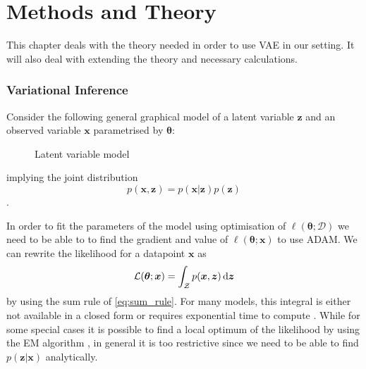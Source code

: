 \chapter{Methods and Theory}
\label{MethodsCh}

This chapter deals with the theory needed in order to use VAE in our setting. It
will also deal with extending the theory and necessary calculations.

\subsection{Variational Inference}
Consider the following general graphical model of a latent variable $\bm{z}$ and
an observed variable $\bm{x}$ parametrised by $\bm{\theta}$:
\begin{figure}[H]
  \label{tikz:latent_variable_model}
  \centering
  \caption{Latent variable model}
\end{figure}
implying the joint distribution
\begin{equation}
  \label{eq:latent_variable_model}
  p(\bm{x}, \bm{z}) = p(\bm{x} | \bm{z}) p(\bm{z})
\end{equation}.

In order to fit the parameters of the model using optimisation of
$\ell(\bm{\theta} ; \mathcal{D})$ we need to be able to to find the gradient and
value of $\ell(\bm{\theta} ; \bm{x})$ to use ADAM. We can rewrite
the likelihood for a datapoint $\bm{x}$ as
\begin{equation}
  \label{eq:likelihood_integrate_out_latent}
  \mathcal{L}(\bm{\theta} ; \bm{x}) = \int_{\mathcal{Z}} p(\bm{x}, \bm{z}) \dif \bm{z}
\end{equation}
by using the sum rule of \ref{eq:sum_rule}. For many models, this integral is
either not available in a closed form or requires exponential time to compute
\cite{blei_variational_2017}. While for some special cases it is possible to
find a local optimum of the likelihood by using the EM algorithm
\cite{Dempster77maximumlikelihood}, in general it is too restrictive since we
need to be able to find $p(\bm{z} | \bm{x})$ analytically.

